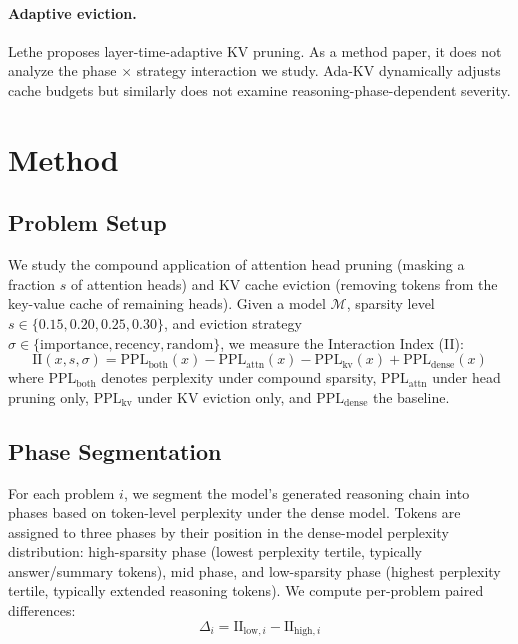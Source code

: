 \documentclass[11pt]{article}
\begin{document}
\paragraph{Adaptive eviction.}
Lethe \citep{lethe2026} proposes layer-time-adaptive KV pruning. As a method paper, it does not analyze the phase $\times$ strategy interaction we study. Ada-KV \citep{adakv2024} dynamically adjusts cache budgets but similarly does not examine reasoning-phase-dependent severity.

\section{Method}

\subsection{Problem Setup}

We study the compound application of attention head pruning (masking a fraction $s$ of attention heads) and KV cache eviction (removing tokens from the key-value cache of remaining heads). Given a model $\mathcal{M}$, sparsity level $s \in \{0.15, 0.20, 0.25, 0.30\}$, and eviction strategy $\sigma \in \{\text{importance}, \text{recency}, \text{random}\}$, we measure the Interaction Index (II):
\begin{equation}
\text{II}(x, s, \sigma) = \text{PPL}_{\text{both}}(x) - \text{PPL}_{\text{attn}}(x) - \text{PPL}_{\text{kv}}(x) + \text{PPL}_{\text{dense}}(x)
\end{equation}
where $\text{PPL}_{\text{both}}$ denotes perplexity under compound sparsity, $\text{PPL}_{\text{attn}}$ under head pruning only, $\text{PPL}_{\text{kv}}$ under KV eviction only, and $\text{PPL}_{\text{dense}}$ the baseline.

\subsection{Phase Segmentation}

For each problem $i$, we segment the model's generated reasoning chain into phases based on token-level perplexity under the dense model. Tokens are assigned to three phases by their position in the dense-model perplexity distribution: high-sparsity phase (lowest perplexity tertile, typically answer/summary tokens), mid phase, and low-sparsity phase (highest perplexity tertile, typically extended reasoning tokens). We compute per-problem paired differences:
\begin{equation}
\Delta_i = \text{II}_{\text{low},i} - \text{II}_{\text{high},i}
\end{equation}
\end{document}
